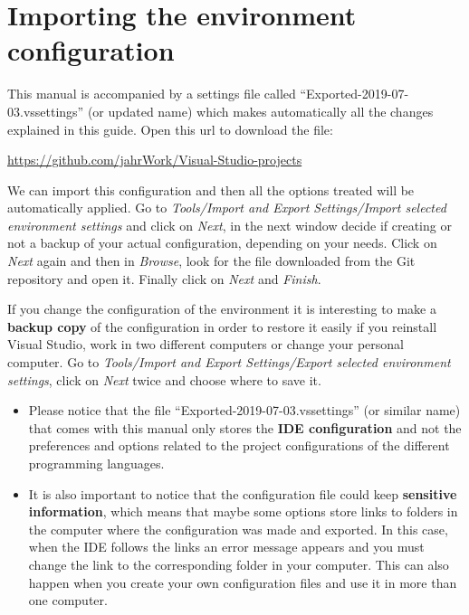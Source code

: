     \vspace{-0.5cm}
    \FloatBarrier
    \section{Importing the environment configuration}
    
This manual is accompanied by a settings file called ``Exported-2019-07-03.vssettings'' (or updated name) which makes automatically all the changes explained in this guide. Open this url to download the file:

\url{https://github.com/jahrWork/Visual-Studio-projects}
 
We can import this configuration and then all the options treated will be automatically applied. Go to \textit{Tools/Import and Export Settings/Import selected environment settings} and click on \textit{Next}, in the next window decide if creating or not a backup of your actual configuration, depending on your needs. Click on \textit{Next} again and then in \textit{Browse}, look for the file downloaded from the Git repository and open it. Finally click on \textit{Next} and \textit{Finish}.    
    
If you change the configuration of the environment it is interesting to make a \textbf{backup copy} of the configuration in order to restore it easily if you reinstall Visual Studio, work in two different computers or change your personal computer. Go to \textit{Tools/Import and Export Settings/Export selected environment settings}, click on \textit{Next} twice and choose where to save it.
    
\begin{IN}
    \begin{itemize}
        \item Please notice that the file ``Exported-2019-07-03.vssettings'' (or similar name) that comes with this manual only stores the \textbf{IDE configuration} and not the preferences and options related to the project configurations of the different programming languages.
            
        \item It is also important to notice that the configuration file could keep \textbf{sensitive information}, which means that maybe some options store links to folders in the computer where the configuration was made and exported. In this case, when the IDE follows the links an error message appears and you must change the link to the corresponding folder in your computer. This can also happen when you create your own configuration files and use it in more than one computer.  
    \end{itemize}
\end{IN}
    

